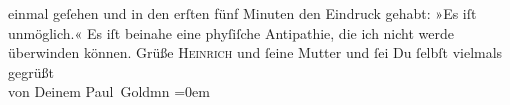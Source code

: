 \begin{ledgroupsized}[t]{13cm}
               einmal geſehen und in den erſten fünf Minuten den Eindruck gehabt: »Es iſt
               unmöglich.« Es iſt beinahe eine phyſiſche Antipathie, die ich nicht werde überwinden
               können.\pend
           \pstart
           Grüße \textsc{Heinrich} und ſeine Mutter und
               ſei Du ſelbſt vielmals gegrüßt {\\[\baselineskip]}von Deinem \spacefill\mbox{Paul Goldmn}\pend
           \leftskip=0em{}
         
         \endnumbering{}\end{ledgroupsized}  \newcommand{\dateiname}{L03230}\newcommand{\titel}{Paul Goldmann an Arthur Schnitzler, 24. 11. [1902]}\newcommand{\editorInnen}{Martin Anton Müller und Laura Untner}
      